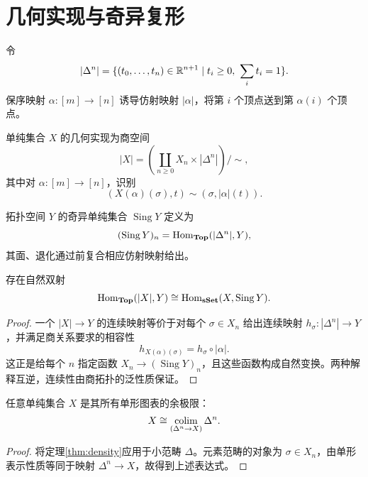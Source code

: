 \section{几何实现与奇异复形}
\begin{definition}[拓扑标准单形]
令
\[
|\Delta^n|=\{(t_0,\ldots,t_n)\in\mathbb R^{n+1}\mid t_i\ge0,\ \sum_i t_i=1\}.
\]
保序映射 $\alpha:[m]\to[n]$ 诱导仿射映射 $|\alpha|$，将第 $i$ 个顶点送到第 $\alpha(i)$ 个顶点。
\end{definition}
\begin{definition}[几何实现]
单纯集合 $X$ 的几何实现为商空间
\[
|X|=\left(\coprod_{n\ge0}X_n\times|\Delta^n|\right)\big/\sim,
\]
其中对 $\alpha:[m]\to[n]$，识别
\[
(X(\alpha)(\sigma),t)\sim(\sigma,|\alpha|(t)).
\]
\end{definition}
\begin{definition}[奇异单纯集合]
拓扑空间 $Y$ 的奇异单纯集合 $\operatorname{Sing}Y$ 定义为
\[
(\operatorname{Sing}Y)_n=\operatorname{Hom}_{\mathbf{Top}}(|\Delta^n|,Y),
\]
其面、退化通过前复合相应仿射映射给出。
\end{definition}
\begin{theorem}[实现与奇异复形的伴随]
存在自然双射
\[
\operatorname{Hom}_{\mathbf{Top}}(|X|,Y)\cong\operatorname{Hom}_{\mathbf{sSet}}(X,\operatorname{Sing}Y).
\]
\end{theorem}
\begin{proof}
一个 $|X|\to Y$ 的连续映射等价于对每个 $\sigma\in X_n$ 给出连续映射 $h_\sigma:|\Delta^n|\to Y$，并满足商关系要求的相容性
\[
h_{X(\alpha)(\sigma)}=h_\sigma\circ|\alpha|.
\]
这正是给每个 $n$ 指定函数 $X_n\to(\operatorname{Sing}Y)_n$，且这些函数构成自然变换。两种解释互逆，连续性由商拓扑的泛性质保证。
\end{proof}
\begin{proposition}[单形拼装]
任意单纯集合 $X$ 是其所有单形图表的余极限：
\[
X\cong\operatorname*{colim}_{(\Delta^n\to X)}\Delta^n.
\]
\end{proposition}
\begin{proof}
将定理\ref{thm:density}应用于小范畴 $\Delta$。元素范畴的对象为 $\sigma\in X_n$，由单形表示性质等同于映射 $\Delta^n\to X$，故得到上述表达式。
\end{proof}

